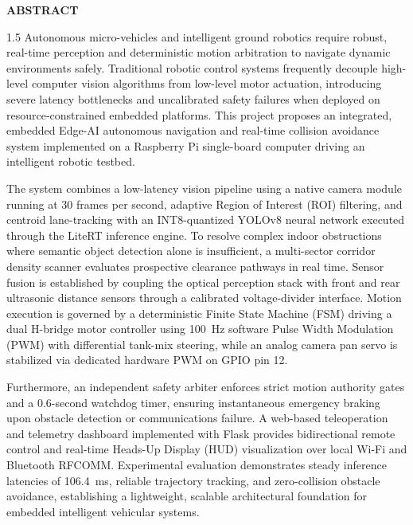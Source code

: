 \newpage
\thispagestyle{fancy}
\begin{center}
\vspace*{0.2cm}
{\Large\textbf{ABSTRACT}}
\end{center}
\vspace{0.8cm}

\noindent
\begin{spacing}{1.5}
Autonomous micro-vehicles and intelligent ground robotics require robust, real-time perception and deterministic motion arbitration to navigate dynamic environments safely. Traditional robotic control systems frequently decouple high-level computer vision algorithms from low-level motor actuation, introducing severe latency bottlenecks and uncalibrated safety failures when deployed on resource-constrained embedded platforms. This project proposes an integrated, embedded Edge-AI autonomous navigation and real-time collision avoidance system implemented on a Raspberry Pi single-board computer driving an intelligent robotic testbed.

The system combines a low-latency vision pipeline using a native camera module running at 30 frames per second, adaptive Region of Interest (ROI) filtering, and centroid lane-tracking with an INT8-quantized YOLOv8 neural network executed through the LiteRT inference engine. To resolve complex indoor obstructions where semantic object detection alone is insufficient, a multi-sector corridor density scanner evaluates prospective clearance pathways in real time. Sensor fusion is established by coupling the optical perception stack with front and rear ultrasonic distance sensors through a calibrated voltage-divider interface. Motion execution is governed by a deterministic Finite State Machine (FSM) driving a dual H-bridge motor controller using 100~Hz software Pulse Width Modulation (PWM) with differential tank-mix steering, while an analog camera pan servo is stabilized via dedicated hardware PWM on GPIO pin 12.

Furthermore, an independent safety arbiter enforces strict motion authority gates and a 0.6-second watchdog timer, ensuring instantaneous emergency braking upon obstacle detection or communications failure. A web-based teleoperation and telemetry dashboard implemented with Flask provides bidirectional remote control and real-time Heads-Up Display (HUD) visualization over local Wi-Fi and Bluetooth RFCOMM. Experimental evaluation demonstrates steady inference latencies of 106.4~ms, reliable trajectory tracking, and zero-collision obstacle avoidance, establishing a lightweight, scalable architectural foundation for embedded intelligent vehicular systems.
\end{spacing}
